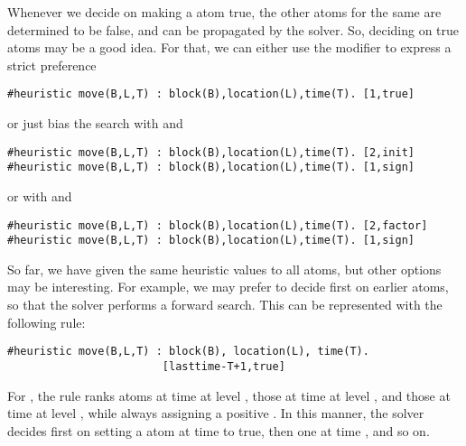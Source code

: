 Whenever we decide on making a  atom true,  
the other  atoms for the same  are determined to be false,
and can be propagated by the solver. 
So, deciding on true  atoms may be a good idea.
For that, we can either use the  modifier to express a strict preference
\begin{lstlisting}[basicstyle=\small\ttfamily,numbers=none]
#heuristic move(B,L,T) : block(B),location(L),time(T). [1,true]
\end{lstlisting}
or just bias the search with  and 
\begin{lstlisting}[basicstyle=\small\ttfamily,numbers=none]
#heuristic move(B,L,T) : block(B),location(L),time(T). [2,init]
#heuristic move(B,L,T) : block(B),location(L),time(T). [1,sign]
\end{lstlisting}
or with  and 
\begin{lstlisting}[basicstyle=\small\ttfamily,numbers=none]
#heuristic move(B,L,T) : block(B),location(L),time(T). [2,factor]
#heuristic move(B,L,T) : block(B),location(L),time(T). [1,sign]
\end{lstlisting}

So far, we have given the same heuristic values to all  atoms,
but other options may be interesting. 
For example, we may prefer to decide first on earlier  atoms,
so that the solver performs a forward search. 
This can be represented with the following rule:
\begin{lstlisting}[basicstyle=\small\ttfamily,numbers=none]
#heuristic move(B,L,T) : block(B), location(L), time(T). 
                        [lasttime-T+1,true]
\end{lstlisting}
For ,
the rule ranks  atoms at time  at level ,
those at time  at level , and 
those at time  at level ,
while always assigning a positive .
In this manner, 
the solver decides first on setting a  atom at time  to true, 
then one at time , and so on.

